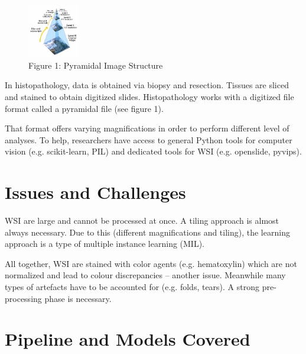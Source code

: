 \documentclass[a4paper]{article}
\begin{document}
\begin{figure} %
    \centering
    \includegraphics[width=0.2\textwidth]{pyramid}\\
    {\scriptsize Figure 1: Pyramidal Image Structure}
\end{figure}

In histopathology, data is obtained via biopsy and resection. Tissues are sliced and stained to obtain digitized slides. Histopathology works with a digitized file format called a pyramidal file (see figure 1).

That format offers varying magnifications in order to perform different level of analyses. To help, researchers have access to general Python tools for computer vision (e.g. scikit-learn, PIL) and dedicated tools for WSI (e.g. openslide, pyvips).

\section{Issues and Challenges}

WSI are large and cannot be processed at once. A tiling approach is almost always necessary. Due to this (different magnifications and tiling), the learning approach is a type of multiple instance learning (MIL).

All together, WSI are stained with color agents (e.g. hematoxylin) which are not normalized and lead to colour discrepancies -- another issue. Meanwhile many types of artefacts have to be accounted for (e.g. folds, tears). A strong pre-processing phase is necessary.

\section{Pipeline and Models Covered}
\end{document}
